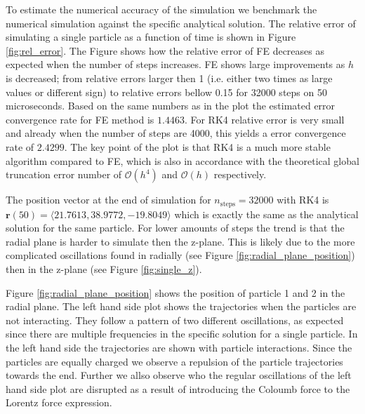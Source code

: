 \documentclass[../main_proj3.tex]{subfiles}
\begin{document}
To estimate the numerical accuracy of the simulation we benchmark the numerical simulation against the specific analytical solution. The relative error of simulating a single particle as a function of time is shown in Figure \ref{fig:rel_error}. The Figure shows how the relative error of FE decreases as expected when the number of steps increases. FE shows large improvements as $h$ is decreased; from relative errors larger then 1 (i.e. either two times as large values or different sign) to relative errors bellow 0.15 for 32000 steps on 50 microseconds. Based on the same numbers as in the plot the estimated error convergence rate for FE method is $1.4463$. For RK4 relative error is very small and already when the number of steps are 4000, this yields a error convergence rate of $2.4299$. The key point of the plot is that RK4 is a much more stable algorithm compared to FE, which is also in accordance with the theoretical global truncation error number of $\mathcal{O}(h^{4})$ and $\mathcal{O}(h)$ respectively.  



The position vector at the end of simulation for $n_{\text{steps}}=32000$ with RK4 is $\mathbf{r}(50) = \langle 21.7613,	38.9772, -19.8049 \rangle$ which is exactly the same as the analytical solution for the same particle. For lower amounts of steps the trend is that the radial plane is harder to simulate then the z-plane. This is likely due to the more complicated oscillations found in radially (see Figure \ref{fig:radial_plane_position}) then in the z-plane (see Figure \ref{fig:single_z}). 

Figure \ref{fig:radial_plane_position} shows the position of particle 1 and 2 in the radial plane. The left hand side plot shows the trajectories when the particles are not interacting. They follow a pattern of two different oscillations, as expected since there are multiple frequencies in the specific solution for a single particle. In the left hand side the trajectories are shown with particle interactions. Since the particles are equally charged we observe a repulsion of the particle trajectories towards the end. Further we allso observe who the regular oscillations of the left hand side plot are disrupted as a result of introducing the Coloumb force to the Lorentz force expression. 
\end{document}
